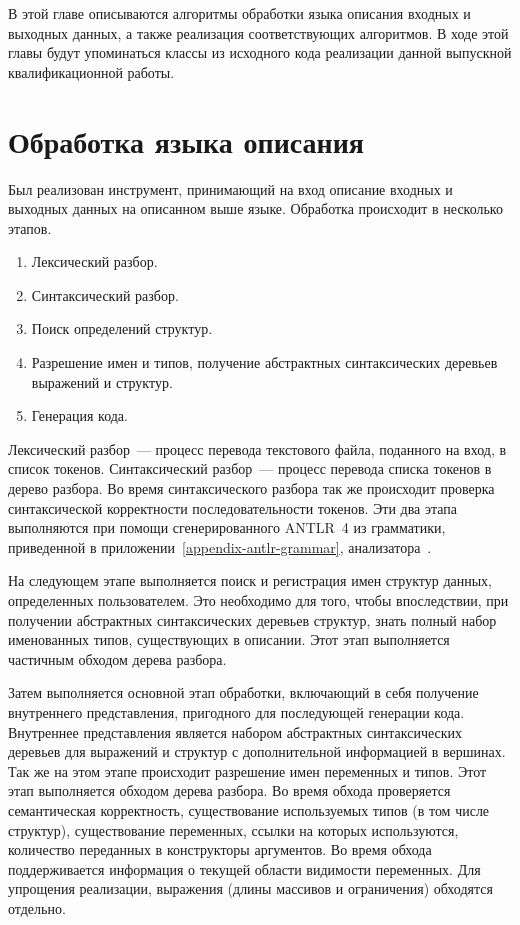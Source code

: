 \documentclass[times,specification,annotation]{style/itmo-student-thesis/itmo-student-thesis}
\begin{document}
В этой главе описываются алгоритмы обработки языка описания входных и выходных данных, а также реализация соответствующих алгоритмов. В ходе этой главы будут упоминаться классы из исходного кода реализации данной выпускной квалификационной работы.

\section{Обработка языка описания}

Был реализован инструмент, принимающий на вход описание входных и выходных данных на описанном выше языке. Обработка происходит в несколько этапов.

\begin{enumerate}[leftmargin=1.75cm]
    \item Лексический разбор.
    \item Синтаксический разбор.
    \item Поиск определений структур.
    \item Разрешение имен и типов, получение абстрактных синтаксических деревьев выражений и структур.
    \item Генерация кода.
\end{enumerate}

Лексический разбор~--- процесс перевода текстового файла, поданного на вход, в список токенов. Синтаксический разбор~--- процесс перевода списка токенов в дерево разбора. Во время синтаксического разбора так же происходит проверка синтаксической корректности последовательности токенов. Эти два этапа выполняются при помощи сгенерированного ANTLR~4 из грамматики, приведенной в приложении~\ref{appendix-antlr-grammar}, анализатора~\cite{parr2013definitive}.

На следующем этапе выполняется поиск и регистрация имен структур данных, определенных пользователем. Это необходимо для того, чтобы впоследствии, при получении абстрактных синтаксических деревьев структур, знать полный набор именованных типов, существующих в описании. Этот этап выполняется частичным обходом дерева разбора.

Затем выполняется основной этап обработки, включающий в себя получение внутреннего представления, пригодного для последующей генерации кода. Внутреннее представления является набором абстрактных синтаксических деревьев для выражений и структур с дополнительной информацией в вершинах. Так же на этом этапе происходит разрешение имен переменных и типов. Этот этап выполняется обходом дерева разбора. Во время обхода проверяется семантическая корректность, существование используемых типов (в том числе структур), существование переменных, ссылки на которых используются, количество переданных в конструкторы аргументов. Во время обхода поддерживается информация о текущей области видимости переменных. Для упрощения реализации, выражения (длины массивов и ограничения) обходятся отдельно.
\end{document}
